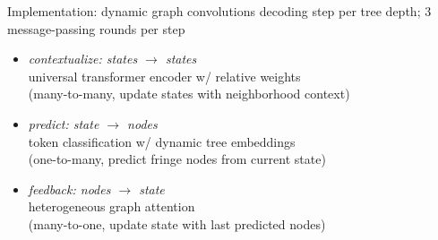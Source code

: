 \documentclass{beamer}
\begin{document}
\begin{frame}{Implementation: dynamic graph convolutions}
     decoding step per tree depth; 3 message-passing rounds per step
    \begin{itemize}
        \item \textit{contextualize: states $\to$ states}\\
        \quad \alert{universal transformer encoder w/ relative weights}\\
        \quad (many-to-many, update states with neighborhood context)
        \item \textit{predict: state $\to$ nodes}\\
        \quad \alert{token classification w/ dynamic tree embeddings}\\
        \quad (one-to-many, predict fringe nodes from current state)
        \item \textit{feedback: nodes $\to$ state}\\
        \quad \alert{heterogeneous graph attention}\\
        \quad (many-to-one, update state with last predicted nodes)
    \end{itemize}
\end{frame}
\end{document}
